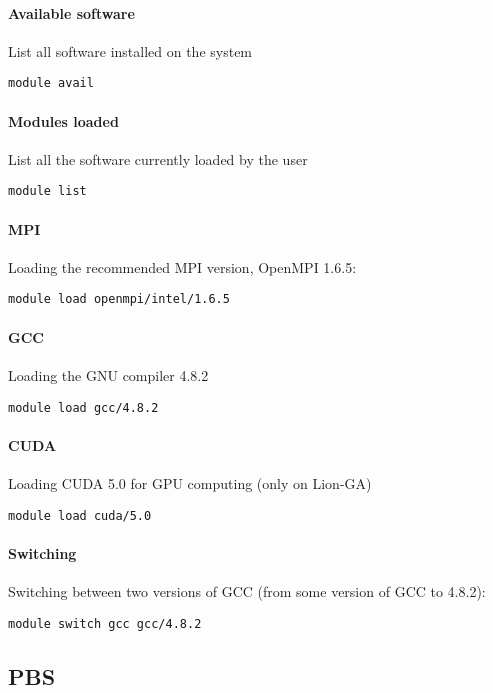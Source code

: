 \documentclass[letterpaper,10pt]{article}
\begin{document}
\paragraph{Available software} List all software installed on the system 
\begin{center}
 \texttt{module avail}
\end{center}

\paragraph{Modules loaded} List all the software currently loaded by the user
\begin{center}
 \texttt{module list}
\end{center}

\paragraph{MPI} Loading the recommended MPI version, OpenMPI 1.6.5:
\begin{center}
 \texttt{module load openmpi/intel/1.6.5}
\end{center}

\paragraph{GCC} Loading the GNU compiler 4.8.2
\begin{center}
 \texttt{module load gcc/4.8.2}
\end{center}

\paragraph{CUDA} Loading CUDA 5.0 for GPU computing (only on Lion-GA)
\begin{center}
 \texttt{module load cuda/5.0}
\end{center}

\paragraph{Switching} Switching between two versions of GCC (from some version of GCC to 4.8.2):
\begin{center}
 \texttt{module switch gcc gcc/4.8.2}
\end{center}

\subsection{PBS}
\end{document}
